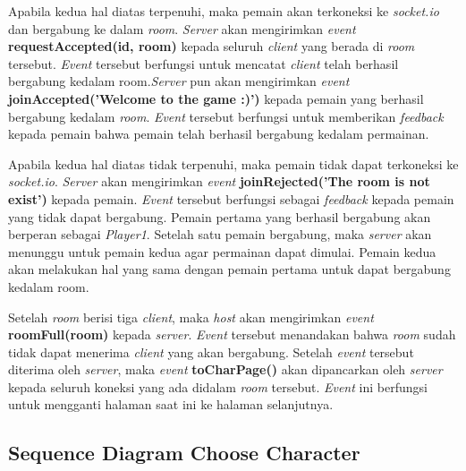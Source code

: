 Apabila kedua hal diatas terpenuhi, maka pemain akan terkoneksi ke \textit{socket.io} dan bergabung ke dalam \textit{room}. \textit{Server} akan mengirimkan \textit{event} \textbf{requestAccepted(id, room)} kepada seluruh \textit{client} yang berada di \textit{room} tersebut. \textit{Event} tersebut berfungsi untuk mencatat \textit{client} telah berhasil bergabung kedalam room.\textit{Server} pun akan mengirimkan \textit{event} \textbf{joinAccepted('Welcome to the game :)')} kepada pemain yang berhasil bergabung kedalam \textit{room}. \textit{Event} tersebut berfungsi untuk memberikan \textit{feedback} kepada pemain bahwa pemain telah berhasil bergabung kedalam permainan.

Apabila kedua hal diatas tidak terpenuhi, maka pemain tidak dapat terkoneksi ke \textit{socket.io}. \textit{Server} akan mengirimkan \textit{event} \textbf{joinRejected('The room is not exist')} kepada pemain. \textit{Event} tersebut berfungsi sebagai \textit{feedback} kepada pemain yang tidak dapat bergabung. Pemain pertama yang berhasil bergabung akan berperan sebagai \textit{Player1}. Setelah satu pemain bergabung, maka \textit{server} akan menunggu untuk pemain kedua agar permainan dapat dimulai. Pemain kedua akan melakukan hal yang sama dengan pemain pertama untuk dapat bergabung kedalam room.

Setelah \textit{room} berisi tiga \textit{client}, maka \textit{host} akan mengirimkan \textit{event} \textbf{roomFull(room)} kepada \textit{server}. \textit{Event} tersebut menandakan bahwa \textit{room} sudah tidak dapat menerima \textit{client} yang akan bergabung. Setelah \textit{event} tersebut diterima oleh \textit{server}, maka \textit{event} \textbf{toCharPage()} akan dipancarkan oleh \textit{server} kepada seluruh koneksi yang ada didalam \textit{room} tersebut. \textit{Event} ini berfungsi untuk mengganti halaman saat ini ke halaman selanjutnya.

\subsection{Sequence Diagram Choose Character}

